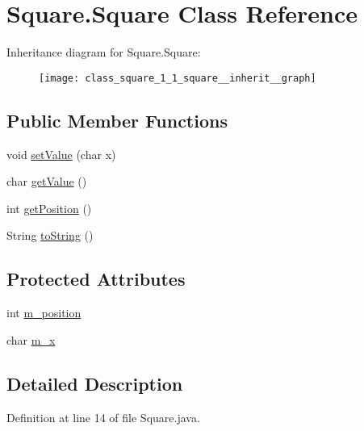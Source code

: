 \hypertarget{class_square_1_1_square}{}\section{Square.\+Square Class Reference}
\label{class_square_1_1_square}


Inheritance diagram for Square.\+Square\+:\nopagebreak
\begin{figure}[H]
\begin{center}
\leavevmode
\texttt{[image: class\_square\_1\_1\_square\_\_inherit\_\_graph]}
\end{center}
\end{figure}
\subsection*{Public Member Functions}
\begin{DoxyCompactItemize}
\item 
void \hyperlink{class_square_1_1_square_a660b369288339117bda29e9a47dae8f6}{set\+Value} (char x)
\item 
char \hyperlink{class_square_1_1_square_a0afb61e6814c61ae2036b15a1a958e6f}{get\+Value} ()
\item 
int \hyperlink{class_square_1_1_square_a270f9a35b0432406d2464201ece4c6b0}{get\+Position} ()
\item 
String \hyperlink{class_square_1_1_square_ab94a6f61d25fde4e49055fcb09d6f33a}{to\+String} ()
\end{DoxyCompactItemize}
\subsection*{Protected Attributes}
\begin{DoxyCompactItemize}
\item 
int \hyperlink{class_square_1_1_square_a459ef3208bfff1bc1a693a335c2cd5e5}{m\+\_\+position}
\item 
char \hyperlink{class_square_1_1_square_a9e0779af7f8cbe54b28f95bb4a5d165a}{m\+\_\+x}
\end{DoxyCompactItemize}


\subsection{Detailed Description}


Definition at line 14 of file Square.\+java.



